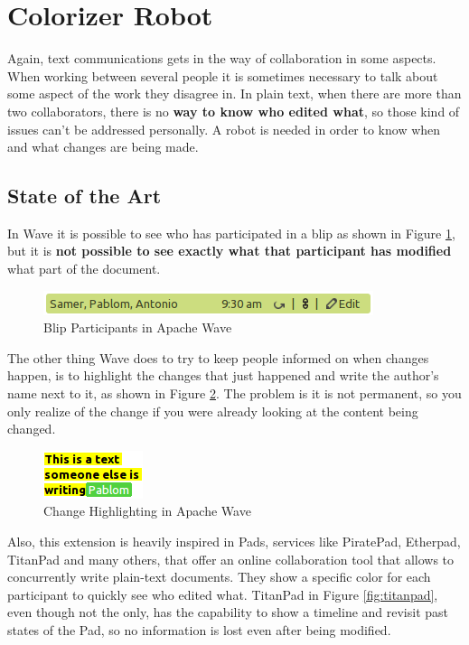 \thispagestyle{sectioned}
\section{Colorizer Robot}
Again, text communications gets in the way of collaboration in some aspects. When working between several people it is sometimes necessary to talk about some aspect of the work they disagree in. In plain text, when there are more than two collaborators, there is no \textbf{way to know who edited what}, so those kind of issues can't be addressed personally. A robot is needed in order to know when and what changes are being made.

\label{subsec:color_soa}
\subsection{State of the Art}
In Wave it is possible to see who has participated in a blip as shown in Figure \ref{fig:participants}, but it is \textbf{not possible to see exactly what that participant has modified} what part of the document.
\begin{figure}[H]
  \center
    \includegraphics[keepaspectratio, scale=0.7]{Media/Captures/Wave/Participants.png}
  \caption{Blip Participants in Apache Wave}
  \label{fig:participants}
\end{figure}
The other thing Wave does to try to keep people informed on when changes happen, is to highlight the changes that just happened and write the author's name next to it, as shown in Figure \ref{fig:participants2}. The problem is it is not permanent, so you only realize of the change if you were already looking at the content being changed.
\begin{figure}[H]
  \center
    \includegraphics[keepaspectratio, scale=0.7]{Media/Captures/Wave/Participants2.png}
  \caption{Change Highlighting in Apache Wave}
  \label{fig:participants2}
\end{figure}
Also, this extension is heavily inspired in Pads, services like PiratePad, Etherpad, TitanPad and many others, that offer an online collaboration tool that allows to concurrently write plain-text documents. They show a specific color for each participant to quickly see who edited what. TitanPad in Figure \ref{fig:titanpad}, even though not the only, has the capability to show a timeline and revisit past states of the Pad, so no information is lost even after being modified.
